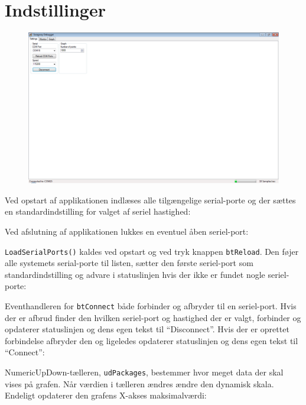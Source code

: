 \documentclass[a4paper,oneside,article,danish,table]{memoir}
\newcommand{\form}[2]{}
\begin{document}
\section{Indstillinger}
\begin{figure}[htbp]
  \centering
  \includegraphics[width=1\textwidth]{settings.png}
\end{figure}
Ved opstart af applikationen indlæses alle tilgængelige serial-porte og der sættes en standardindstilling for valget af seriel hastighed:
\form{34}{39}
Ved afslutning af applikationen lukkes en eventuel åben seriel-port:
\form{41}{48}

\texttt{LoadSerialPorts()} kaldes ved opstart og ved tryk knappen \texttt{btReload}. Den føjer alle systemets serial-porte til listen, sætter den første seriel-port som standardindstilling og advare i statuslinjen hvis der ikke er fundet nogle seriel-porte:
\form{50}{68}

Eventhandleren for \texttt{btConnect} både forbinder og afbryder til en seriel-port. Hvis der er afbrud finder den hvilken seriel-port og hastighed der er valgt, forbinder og opdaterer statuslinjen og dens egen tekst til “Disconnect”. Hvis der er oprettet forbindelse afbryder den og ligeledes opdaterer statuslinjen og dens egen tekst til “Connect”:
\form{76}{104}
NumericUpDown-tælleren, \texttt{udPackages}, bestemmer hvor meget data der skal vises på grafen. Når værdien i tælleren ændres ændre den dynamisk skala. Endeligt opdaterer den grafens X-akses maksimalværdi:
\form{106}{125}
\end{document}
